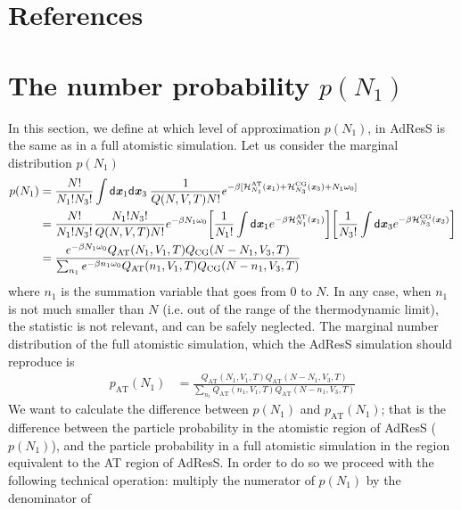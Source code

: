 \documentclass[aip,jcp,a4paper,reprint,onecolumn]{revtex4-1}
\newcommand{\vect}[1]{\textbf{\textit{#1}}}
\newcommand{\dd}[1]{\textsf{#1}}
\newcommand{\AT}{{\textrm{{AT}}}}
\newcommand{\CG}{{\textrm{CG}}}
\begin{document}
\section*{References}
{}



\appendix

\section{The number probability $p(N_1)$}\label{app:1}
In this section, we define at which level of approximation $p(N_{1})$, in AdResS is the same as in a full atomistic simulation. 
Let us consider the marginal distribution $p(N_1)$
\begin{align}\nonumber
  p(N_1)
  &=
  \frac{N!}{N_1!N_3!}
  \int
  \dd d\vect x_1\dd d\vect x_3  \:
  \frac{1}{Q(N,V,T) N!}
  e^{-\beta
    [\mathcal H_{N_1}^{\AT}(\vect x_1) +
    \mathcal H_{N_3}^{\CG}(\vect x_3) +
    N_1\omega_0]}\\\nonumber
  &=
  \frac{N!}{N_1!N_3!}
  \frac{N_1!N_3!}{Q(N,V,T) N!}
  e^{-\beta N_1\omega_0}
  \bigg[
  \frac1{N_1!}
  \int
  \dd d\vect x_1
  e^{-\beta \mathcal H_{N_1}^{\AT}(\vect x_1)}
  \bigg]
  \bigg[
  \frac1{N_3!}
  \int
  \dd d\vect x_3
  e^{-\beta \mathcal H_{N_3}^{\CG}(\vect x_3)}
  \bigg]  \\\label{eqn:pn1}
  &=
  \frac
  {
    e^{-\beta N_1\omega_0}
    Q_{\AT}(N_1,V_1,T) Q_{\CG}(N-N_1,V_3,T)
  }
  {
    \sum_{n_1}
    e^{-\beta n_1\omega_0}
    Q_{\AT}(n_1,V_1,T) Q_{\CG}(N-n_1,V_3,T)
  }
\end{align}
where $n_1$ is the summation variable that goes from 0 to $N$.
In any case, when $n_1$ is not much smaller than $N$ (i.e. out of the range of the
thermodynamic limit), the statistic is not relevant,
and can be safely neglected.
The marginal number distribution of the full atomistic simulation,
which the AdResS simulation should
reproduce is
\begin{align}
  p_{\AT}(N_1)
  &=
  \frac
  {
    Q_{\AT}(N_1,V_1,T) Q_{\AT}(N-N_1,V_3,T)
  }
  {
    \sum_{n_1}
    Q_{\AT}(n_1,V_1,T) Q_{\AT}(N-n_1,V_3,T)
  }  
\end{align}
We want to calculate the difference between $p(N_1)$ and $p_{\AT}(N_1)$; that is the difference between the particle probability in the atomistic region of AdResS ($p(N_{1})$), and the particle probability in a full atomistic simulation in the region equivalent to the AT region of AdResS.
In order to do so we proceed with the following technical operation: multiply the numerator of $p(N_1)$ by the denominator of
\end{document}
